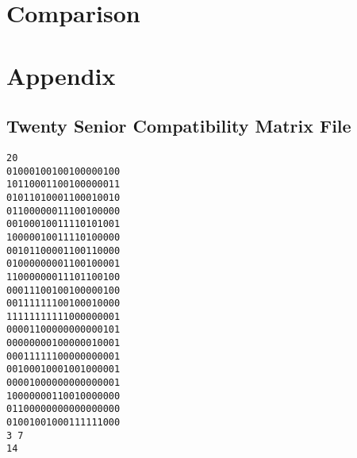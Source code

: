 \documentclass[a4paper]{article}
\begin{document}
\section{Comparison}


\section{Appendix}
\subsection{Twenty Senior Compatibility Matrix File}
\begin{verbatim}
20
01000100100100000100
10110001100100000011
01011010001100010010
01100000011100100000
00100010011110101001
10000010011110100000
00101100001100110000
01000000001100100001
11000000011101100100
00011100100100000100
00111111100100010000
11111111111000000001
00001100000000000101
00000000100000010001
00011111100000000001
00100010001001000001
00001000000000000001
10000000110010000000
01100000000000000000
01001001000111111000
3 7
14
\end{verbatim}
\end{document}
